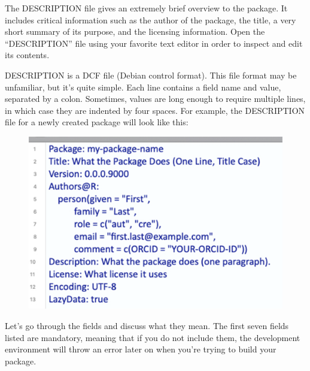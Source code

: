 \documentclass[]{book}
\begin{document}
The DESCRIPTION file gives an extremely brief overview to the package.
It includes critical information such as the author of the package, the
title, a very short summary of its purpose, and the licensing
information. Open the ``DESCRIPTION'' file using your favorite text
editor in order to inspect and edit its contents.

DESCRIPTION is a DCF file (Debian control format). This file format may
be unfamiliar, but it's quite simple. Each line contains a field name
and value, separated by a colon. Sometimes, values are long enough to
require multiple lines, in which case they are indented by four spaces.
For example, the DESCRIPTION file for a newly created package will look
like this:

\begin{figure}
\centering
\includegraphics{images/packageSS/description_blank.png}
\caption{}
\end{figure}

Let's go through the fields and discuss what they mean. The first seven
fields listed are mandatory, meaning that if you do not include them,
the development environment will throw an error later on when you're
trying to build your package.
\end{document}
